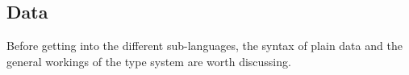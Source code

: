 \subsection{Data}

Before getting into the different sub-languages, the syntax of plain data
and the general workings of the type system are worth discussing.
